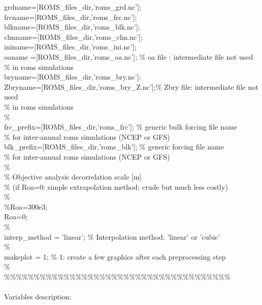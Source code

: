 grdname=[ROMS\_files\_dir,'roms\_grd.nc'];\\
frcname=[ROMS\_files\_dir,'roms\_frc.nc'];\\
blkname=[ROMS\_files\_dir,'roms\_blk.nc'];\\
clmname=[ROMS\_files\_dir,'roms\_clm.nc'];\\
ininame=[ROMS\_files\_dir,'roms\_ini.nc'];\\
oaname =[ROMS\_files\_dir,'roms\_oa.nc'];    \% oa file  : intermediate file not used\\
\%            in roms simulations\\
bryname=[ROMS\_files\_dir,'roms\_bry.nc'];\\
Zbryname=[ROMS\_files\_dir,'roms\_bry\_Z.nc'];\% Zbry file: intermediate file not used\\
\%            in roms simulations\\
\%\\
frc\_prefix=[ROMS\_files\_dir,'roms\_frc'];   \% generic bulk forcing file name \\
\% for inter-annual roms simulations (NCEP or GFS)\\
blk\_prefix=[ROMS\_files\_dir,'roms\_blk'];   \% generic forcing file name\\
\% for inter-annual roms simulations (NCEP or GFS)\\
\%\\
\% Objective analysis decorrelation scale [m]\\
\% (if Roa=0: simple extrapolation method; crude but much less costly)\\
\%\\
\%Roa=300e3;\\
Roa=0;\\
\%\\
interp\_method = 'linear';           \% Interpolation method: 'linear' or 'cubic'\\
\%\\
makeplot     = 1;                 \% 1: create a few graphics after each preprocessing step\\
\%\\
\%\%\%\%\%\%\%\%\%\%\%\%\%\%\%\%\%\%\%\%\%\%\%\%\%\%\%\%\%\%\%\%\%\%\%\%\%\%\\
\\
Variables description:
